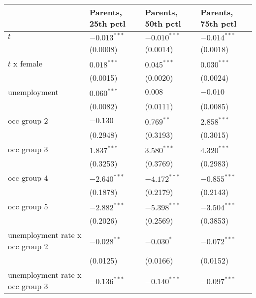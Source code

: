 \begin{tabular}{llll}
\toprule
{} & Parents, 25th pctl & Parents, 50th pctl & Parents, 75th pctl \\
\midrule
$t$                                      &     $-0.013^{***}$ &     $-0.010^{***}$ &     $-0.014^{***}$ \\
                                         &           (0.0008) &           (0.0014) &           (0.0018) \\
$t$ x female                             &      $0.018^{***}$ &      $0.045^{***}$ &      $0.030^{***}$ \\
                                         &           (0.0015) &           (0.0020) &           (0.0024) \\
unemployment                             &      $0.060^{***}$ &            $0.008$ &           $-0.010$ \\
                                         &           (0.0082) &           (0.0111) &           (0.0085) \\
occ group 2                              &           $-0.130$ &       $0.769^{**}$ &      $2.858^{***}$ \\
                                         &           (0.2948) &           (0.3193) &           (0.3015) \\
occ group 3                              &      $1.837^{***}$ &      $3.580^{***}$ &      $4.320^{***}$ \\
                                         &           (0.3253) &           (0.3769) &           (0.2983) \\
occ group 4                              &     $-2.640^{***}$ &     $-4.172^{***}$ &     $-0.855^{***}$ \\
                                         &           (0.1878) &           (0.2179) &           (0.2143) \\
occ group 5                              &     $-2.882^{***}$ &     $-5.398^{***}$ &     $-3.504^{***}$ \\
                                         &           (0.2026) &           (0.2569) &           (0.3853) \\
unemployment rate x occ group 2          &      $-0.028^{**}$ &         $-0.030^*$ &     $-0.072^{***}$ \\
                                         &           (0.0125) &           (0.0166) &           (0.0152) \\
unemployment rate x occ group 3          &     $-0.136^{***}$ &     $-0.140^{***}$ &     $-0.097^{***}$ \\

\end{tabular}
